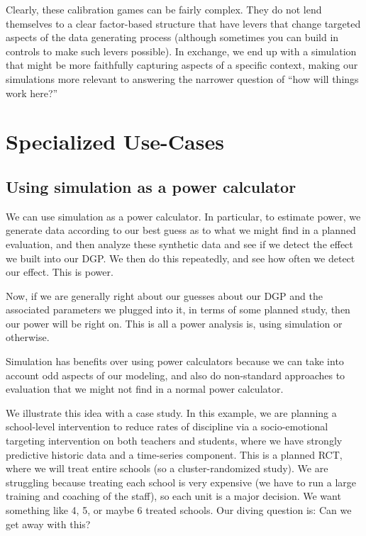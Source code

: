 \documentclass[
]{book}
\begin{document}
Clearly, these calibration games can be fairly complex.
They do not lend themselves to a clear factor-based structure that have levers that change targeted aspects of the data generating process (although sometimes you can build in controls to make such levers possible).
In exchange, we end up with a simulation that might be more faithfully capturing aspects of a specific context, making our simulations more relevant to answering the narrower question of ``how will things work here?''

\part{Specialized Use-Cases}\label{part-specialized-use-cases}

\chapter{Using simulation as a power calculator}\label{sec:power}

We can use simulation as a power calculator.
In particular, to estimate power, we generate data according to our best guess as to what we might find in a planned evaluation, and then analyze these synthetic data and see if we detect the effect we built into our DGP.
We then do this repeatedly, and see how often we detect our effect.
This is power.

Now, if we are generally right about our guesses about our DGP and the associated parameters we plugged into it, in terms of some planned study, then our power will be right on.
This is all a power analysis is, using simulation or otherwise.

Simulation has benefits over using power calculators because we can take into account odd aspects of our modeling, and also do non-standard approaches to evaluation that we might not find in a normal power calculator.

We illustrate this idea with a case study.
In this example, we are planning a school-level intervention to reduce rates of discipline via a socio-emotional targeting intervention on both teachers and students, where we have strongly predictive historic data and a time-series component.
This is a planned RCT, where we will treat entire schools (so a cluster-randomized study).
We are struggling because treating each school is very expensive (we have to run a large training and coaching of the staff), so each unit is a major decision.
We want something like 4, 5, or maybe 6 treated schools.
Our diving question is: Can we get away with this?
\end{document}
